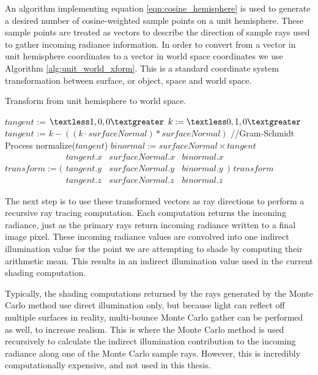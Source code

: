 An algorithm implementing equation \ref{eqn:cosine_hemisphere} is used to generate a desired number of cosine-weighted sample points on a unit hemisphere. These sample points are treated as vectors to describe the direction of sample rays used to gather incoming radiance information. In order to convert from a vector in unit hemisphere coordinates to a vector in world space coordinates we use Algorithm \ref{alg:unit_world_xform}. This is a standard coordinate system transformation between surface, or object, space and world space.

\begin{algorithm}[H]
\captionfont
\caption[Unit to World Hemisphere]{Transform from unit hemisphere to world space.}
\label{alg:unit_world_xform}
{\fontsize{10}{9}\selectfont
\begin{algorithmic}
         \State $tangent$ :=  $\textless1,0,0\textgreater$
      \Else
         \State $k := \textless0,1,0\textgreater$
         \State $tangent$ :=  $k - ((k \cdot surfaceNormal)*surfaceNormal)$ //Gram-Schmidt Process
         \State normalize($tangent$)
      \EndIf
      \State $binormal := surfaceNormal \times tangent$
      \State $transform := \bigl( \begin{smallmatrix} tangent.x & surfaceNormal.x & binormal.x \\ tangent.y & surfaceNormal.y & binormal.y \\ tangent.z & surfaceNormal.z & binormal.z \end{smallmatrix} \bigr)$
      \State \Return $transform$
   \EndFunction
\end{algorithmic}
}
\end{algorithm}

The next step is to use these transformed vectors as ray directions to perform a recursive ray tracing computation. Each computation returns the incoming radiance, just as the primary rays return incoming radiance written to a final image pixel. These incoming radiance values are convolved into one indirect illumination value for the point we are attempting to shade by computing their arithmetic mean. This results in an indirect illumination value used in the current shading computation.

Typically, the shading computations returned by the rays generated by the Monte Carlo method use direct illumination only, but because light can reflect off multiple surfaces in reality, multi-bounce Monte Carlo gather can be performed as well, to increase realism. This is where the Monte Carlo method is used recursively to calculate the indirect illumination contribution to the incoming radiance along one of the Monte Carlo sample rays. However, this is incredibly computationally expensive, and not used in this thesis.

